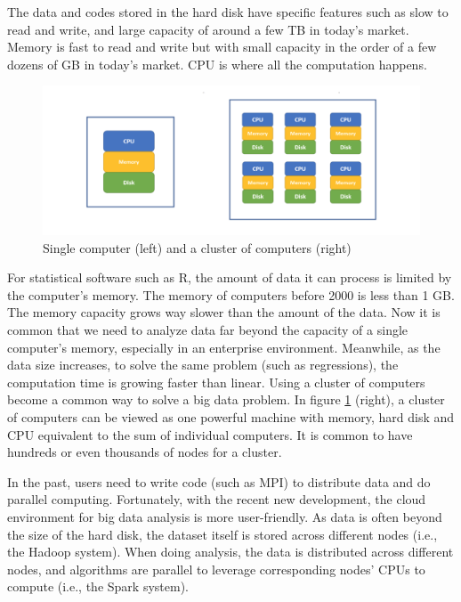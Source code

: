 \documentclass[12pt,]{krantz}
\begin{document}
The data and codes stored in the hard disk have specific features such as slow to read and write, and large capacity of around a few TB in today's market. Memory is fast to read and write but with small capacity in the order of a few dozens of GB in today's market. CPU is where all the computation happens.

\begin{figure}

{\centering \includegraphics[width=0.8\linewidth]{images/cluster} 

}

\caption{Single computer (left) and a cluster of computers (right)}\label{fig:sparkcluster}
\end{figure}

For statistical software such as R, the amount of data it can process is limited by the computer's memory. The memory of computers before 2000 is less than 1 GB. The memory capacity grows way slower than the amount of the data. Now it is common that we need to analyze data far beyond the capacity of a single computer's memory, especially in an enterprise environment. Meanwhile, as the data size increases, to solve the same problem (such as regressions), the computation time is growing faster than linear. Using a cluster of computers become a common way to solve a big data problem. In figure \ref{fig:sparkcluster} (right), a cluster of computers can be viewed as one powerful machine with memory, hard disk and CPU equivalent to the sum of individual computers. It is common to have hundreds or even thousands of nodes for a cluster.

In the past, users need to write code (such as MPI) to distribute data and do parallel computing. Fortunately, with the recent new development, the cloud environment for big data analysis is more user-friendly. As data is often beyond the size of the hard disk, the dataset itself is stored across different nodes (i.e., the Hadoop system). When doing analysis, the data is distributed across different nodes, and algorithms are parallel to leverage corresponding nodes' CPUs to compute (i.e., the Spark system).
\end{document}
